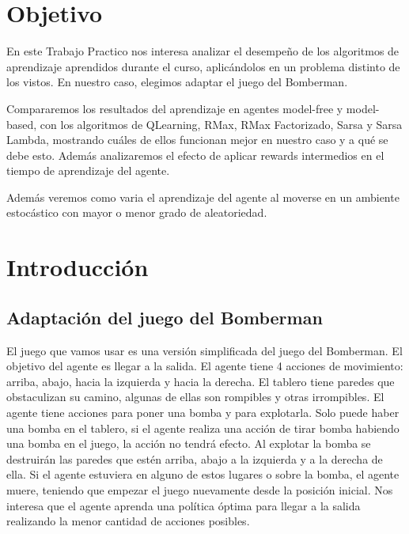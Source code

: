 \documentclass[a4paper,spanish] {article}
\begin{document}
\pagestyle{headings}



\newpage




\maketitle

\section{Objetivo}
	En  este Trabajo Practico nos interesa analizar el desempeño de los algoritmos de aprendizaje aprendidos durante el curso,  aplicándolos  en un problema distinto de los vistos. En nuestro caso, elegimos adaptar el juego del Bomberman. 
	
	Compararemos los resultados del aprendizaje en agentes model-free y model-based, con los algoritmos de QLearning, RMax, RMax Factorizado, Sarsa y Sarsa Lambda, mostrando cuáles de ellos funcionan mejor en nuestro caso y a qué se debe esto. Además analizaremos el efecto de aplicar rewards intermedios en el tiempo de aprendizaje del agente.
	
	Además veremos como varia el aprendizaje del agente al moverse en un ambiente estocástico con mayor o menor grado de aleatoriedad.

\section{Introducción}
	\subsection{Adaptación del juego del Bomberman}
	El juego que vamos usar es una versión simplificada del juego del Bomberman. El objetivo del agente es llegar a la salida. El agente tiene 4 acciones de movimiento: arriba, abajo, hacia la izquierda y hacia la derecha. El tablero tiene paredes que obstaculizan su camino, algunas de ellas son rompibles y otras irrompibles. El agente tiene acciones para poner una bomba y para explotarla. Solo puede haber una bomba en el tablero, si el agente realiza una acción de tirar bomba habiendo una bomba en el juego, la acción no tendrá efecto. Al explotar la bomba se destruirán las paredes que estén arriba, abajo a la izquierda y a la derecha de ella. Si el agente estuviera en alguno de estos lugares o sobre la bomba, el agente muere, teniendo que empezar el juego nuevamente desde la posición inicial. Nos interesa que el agente aprenda una política óptima para llegar a la salida realizando la menor cantidad de acciones posibles.
\end{document}
